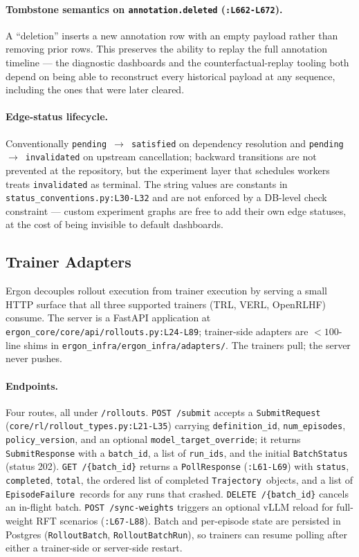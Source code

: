 \documentclass{article}
\begin{document}
\paragraph{Tombstone semantics on
\texttt{annotation.deleted} (\texttt{:L662-L672}).} A
``deletion'' inserts a new annotation row with an empty
payload rather than removing prior rows. This preserves the
ability to replay the full annotation timeline --- the
diagnostic dashboards and the counterfactual-replay tooling
both depend on being able to reconstruct every historical
payload at any sequence, including the ones that were later
cleared.

\paragraph{Edge-status lifecycle.} Conventionally
\texttt{pending}~$\to$~\texttt{satisfied} on dependency
resolution and \texttt{pending}~$\to$~\texttt{invalidated} on
upstream cancellation; backward transitions are not
prevented at the repository, but the experiment layer that
schedules workers treats \texttt{invalidated} as terminal.
The string values are constants in
\texttt{status\_conventions.py:L30-L32} and are not enforced
by a DB-level check constraint --- custom experiment graphs
are free to add their own edge statuses, at the cost of being
invisible to default dashboards.

\subsection{Trainer Adapters}
\label{app:verl}

Ergon decouples rollout execution from trainer execution by
serving a small HTTP surface that all three supported trainers
(TRL, VERL, OpenRLHF) consume. The server is a FastAPI
application at \texttt{ergon\_core/core/api/rollouts.py:L24-L89};
trainer-side adapters are
$<100$-line shims in
\texttt{ergon\_infra/ergon\_infra/adapters/}. The trainers pull;
the server never pushes.

\paragraph{Endpoints.} Four routes, all under
\texttt{/rollouts}. \texttt{POST /submit} accepts a
\texttt{SubmitRequest} (\texttt{core/rl/rollout\_types.py:L21-L35})
carrying \texttt{definition\_id}, \texttt{num\_episodes},
\texttt{policy\_version}, and an optional
\texttt{model\_target\_override}; it returns
\texttt{SubmitResponse} with a \texttt{batch\_id}, a list of
\texttt{run\_ids}, and the initial \texttt{BatchStatus} (status
202). \texttt{GET /\{batch\_id\}} returns a \texttt{PollResponse}
(\texttt{:L61-L69}) with \texttt{status}, \texttt{completed},
\texttt{total}, the ordered list of completed
\texttt{Trajectory}~objects, and a list of
\texttt{EpisodeFailure}~records for any runs that crashed.
\texttt{DELETE /\{batch\_id\}} cancels an in-flight batch.
\texttt{POST /sync-weights} triggers an optional vLLM reload
for full-weight RFT scenarios (\texttt{:L67-L88}). Batch and
per-episode state are persisted in Postgres
(\texttt{RolloutBatch}, \texttt{RolloutBatchRun}), so trainers
can resume polling after either a trainer-side or server-side
restart.
\end{document}
